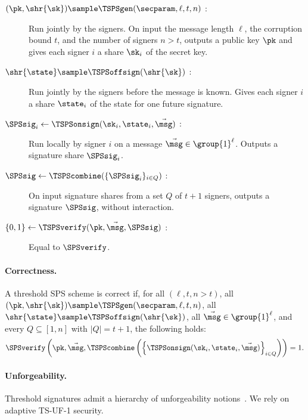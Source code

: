 \begin{description}

  \item[{$(\pk, \shr{\sk}) \sample \TSPSgen(\secparam, \ell, t, n)$ :}] Run
jointly by the signers. On input the message length $\ell$, the corruption bound
$t$, and the number of signers $n > t$, outputs a public key $\pk$ and gives
each signer $i$ a share $\sk_i$ of the secret key.

  \item[{$\shr{\state} \sample \TSPSoffsign(\shr{\sk})$ :}] Run jointly by the
signers before the message is known. Gives each signer $i$ a share $\state_i$ of
the state for one future signature.

  \item[{$\SPSsig_i \leftarrow \TSPSonsign(\sk_i, \state_i, \vec{\msg})$ :}] Run
locally by signer $i$ on a message $\vec{\msg} \in \group{1}^\ell$. Outputs a
signature share $\SPSsig_i$.

  \item[{$\SPSsig \leftarrow \TSPScombine(\{\SPSsig_i\}_{i \in Q})$ :}] On input
signature shares from a set $Q$ of $t+1$ signers, outputs a signature
$\SPSsig$, without interaction.

  \item[$\{0,1\} \leftarrow \TSPSverify(\pk, \vec{\msg}, \SPSsig)$ :] Equal to
$\SPSverify$.

\end{description}

\paragraph{Correctness.} A threshold SPS scheme is correct if, for all $(\ell, t, n > t)$, all $(\pk, \shr{\sk}) \sample
\TSPSgen(\secparam, \ell, t, n)$, all $\shr{\state} \sample
\TSPSoffsign(\shr{\sk})$, all $\vec{\msg} \in \group{1}^\ell$, and every $Q
\subseteq [1,n]$ with $|Q| = t+1$, the following holds:
%
\begin{equation*}
%
  \SPSverify\left(\pk, \vec{\msg}, \TSPScombine\left(\left\{
\TSPSonsign(\sk_i, \state_i, \vec{\msg}) \right\}_{i \in Q}\right)\right) = 1.
%
\end{equation*}

\paragraph{Unforgeability.} Threshold signatures admit a hierarchy of
unforgeability notions~\cite{C:BCKMTZ22}. We rely on adaptive TS-UF-1 security.


